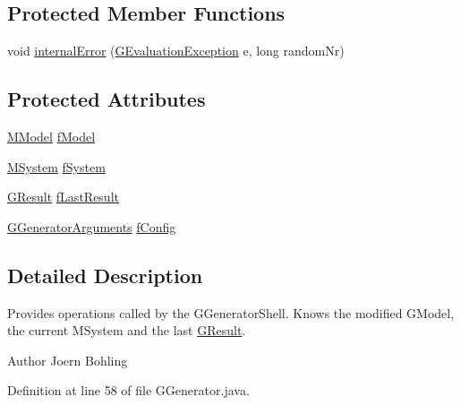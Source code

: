 \subsection*{Protected Member Functions}
\begin{DoxyCompactItemize}
\item 
void \hyperlink{classorg_1_1tzi_1_1use_1_1gen_1_1tool_1_1_g_generator_aef4841f9259839bced97dd4056c032bc}{internal\-Error} (\hyperlink{classorg_1_1tzi_1_1use_1_1gen_1_1assl_1_1dynamics_1_1_g_evaluation_exception}{G\-Evaluation\-Exception} e, long random\-Nr)
\end{DoxyCompactItemize}
\subsection*{Protected Attributes}
\begin{DoxyCompactItemize}
\item 
\hyperlink{classorg_1_1tzi_1_1use_1_1uml_1_1mm_1_1_m_model}{M\-Model} \hyperlink{classorg_1_1tzi_1_1use_1_1gen_1_1tool_1_1_g_generator_ab5d7f671096587723fab0689bd060333}{f\-Model}
\item 
\hyperlink{classorg_1_1tzi_1_1use_1_1uml_1_1sys_1_1_m_system}{M\-System} \hyperlink{classorg_1_1tzi_1_1use_1_1gen_1_1tool_1_1_g_generator_a23eb4998d2d6341e7f05bb57f5e889ad}{f\-System}
\item 
\hyperlink{classorg_1_1tzi_1_1use_1_1gen_1_1tool_1_1_g_result}{G\-Result} \hyperlink{classorg_1_1tzi_1_1use_1_1gen_1_1tool_1_1_g_generator_a62e29def50bae1e0286495fa94e3d5be}{f\-Last\-Result}
\item 
\hyperlink{classorg_1_1tzi_1_1use_1_1gen_1_1tool_1_1_g_generator_arguments}{G\-Generator\-Arguments} \hyperlink{classorg_1_1tzi_1_1use_1_1gen_1_1tool_1_1_g_generator_a3be48455aff08a0fa1704bed67101306}{f\-Config}
\end{DoxyCompactItemize}


\subsection{Detailed Description}
Provides operations called by the {\ttfamily G\-Generator\-Shell}. Knows the modified {\ttfamily G\-Model}, the current {\ttfamily M\-System} and the last {\ttfamily \hyperlink{classorg_1_1tzi_1_1use_1_1gen_1_1tool_1_1_g_result}{G\-Result}}. \begin{DoxyAuthor}{Author}
Joern Bohling 
\end{DoxyAuthor}


Definition at line 58 of file G\-Generator.\-java.




